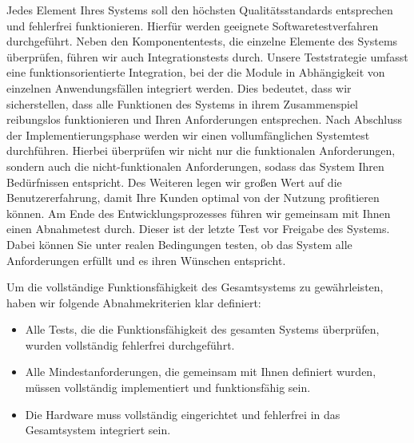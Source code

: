 Jedes Element Ihres Systems soll den höchsten Qualitätsstandards entsprechen und fehlerfrei funktionieren.
Hierfür werden geeignete Softwaretestverfahren durchgeführt.
Neben den Komponententests, die einzelne Elemente des Systems überprüfen, führen wir auch Integrationstests durch.
Unsere Teststrategie umfasst eine funktionsorientierte Integration, bei der die Module in Abhängigkeit von einzelnen Anwendungsfällen integriert werden.
Dies bedeutet, dass wir sicherstellen, dass alle Funktionen des Systems in ihrem Zusammenspiel reibungslos funktionieren und Ihren Anforderungen entsprechen.
Nach Abschluss der Implementierungsphase werden wir einen vollumfänglichen Systemtest durchführen.
Hierbei überprüfen wir nicht nur die funktionalen Anforderungen, sondern auch die nicht-funktionalen Anforderungen, sodass das System Ihren Bedürfnissen entspricht.
Des Weiteren legen wir großen Wert auf die Benutzererfahrung, damit Ihre Kunden optimal von der Nutzung profitieren können.
Am Ende des Entwicklungsprozesses führen wir gemeinsam mit Ihnen einen Abnahmetest durch.
Dieser ist der letzte Test vor Freigabe des Systems.
Dabei können Sie unter realen Bedingungen testen, ob das System alle Anforderungen erfüllt und es ihren Wünschen entspricht.

\bigskip

Um die vollständige Funktionsfähigkeit des Gesamtsystems zu gewährleisten, haben wir folgende Abnahmekriterien klar definiert:
\medskip
\begin{itemize}
    \item Alle Tests, die die Funktionsfähigkeit des gesamten Systems überprüfen, wurden vollständig fehlerfrei durchgeführt.
    \item Alle Mindestanforderungen, die gemeinsam mit Ihnen definiert wurden, müssen vollständig implementiert und funktionsfähig sein.
    \item Die Hardware muss vollständig eingerichtet und fehlerfrei in das Gesamtsystem integriert sein.
\end{itemize}

